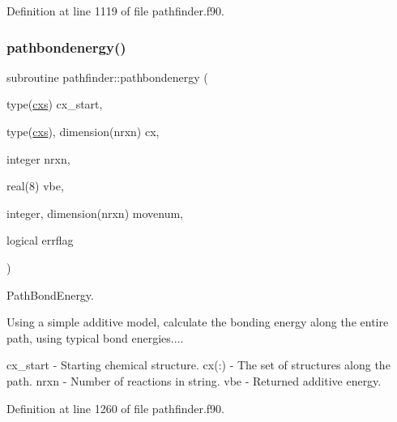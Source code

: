 Definition at line 1119 of file pathfinder.\+f90.

\mbox{\label{namespacepathfinder_a2de94873987728e50c19bae54729c3cd}} 
\subsubsection{\texorpdfstring{pathbondenergy()}{pathbondenergy()}\hspace{0.1cm}{\footnotesize\ttfamily [1/3]}}
{\footnotesize\ttfamily subroutine pathfinder\+::pathbondenergy (\begin{DoxyParamCaption}\item[{type(\mbox{\hyperlink{structchemstr_1_1cxs}{cxs}})}]{cx\+\_\+start,  }\item[{type(\mbox{\hyperlink{structchemstr_1_1cxs}{cxs}}), dimension(nrxn)}]{cx,  }\item[{integer}]{nrxn,  }\item[{real(8)}]{vbe,  }\item[{integer, dimension(nrxn)}]{movenum,  }\item[{logical}]{errflag }\end{DoxyParamCaption})}



Path\+Bond\+Energy. 

Using a simple additive model, calculate the bonding energy along the entire path, using typical bond energies....

cx\+\_\+start -\/ Starting chemical structure. cx(\+:) -\/ The set of structures along the path. nrxn -\/ Number of reactions in string. vbe -\/ Returned additive energy. 

Definition at line 1260 of file pathfinder.\+f90.

\mbox{\label{namespacepathfinder_acc50ac9bfc47024caf9ef5fb5dcba547}} 
